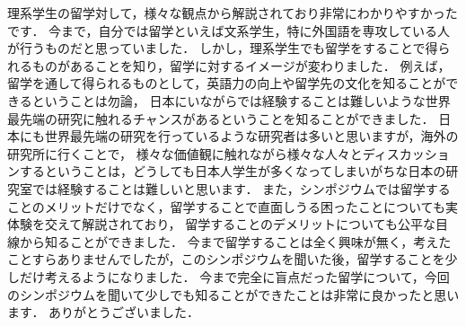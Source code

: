 理系学生の留学対して，様々な観点から解説されており非常にわかりやすかったです．
今まで，自分では留学といえば文系学生，特に外国語を専攻している人が行うものだと思っていました．
しかし，理系学生でも留学をすることで得られるものがあることを知り，留学に対するイメージが変わりました．
例えば，留学を通して得られるものとして，英語力の向上や留学先の文化を知ることができるということは勿論，
日本にいながらでは経験することは難しいような世界最先端の研究に触れるチャンスがあるということを知ることができました．
日本にも世界最先端の研究を行っているような研究者は多いと思いますが，海外の研究所に行くことで，
様々な価値観に触れながら様々な人々とディスカッションするということは，どうしても日本人学生が多くなってしまいがちな日本の研究室では経験することは難しいと思います．
また，シンポジウムでは留学することのメリットだけでなく，留学することで直面しうる困ったことについても実体験を交えて解説されており，
留学することのデメリットについても公平な目線から知ることができました．
今まで留学することは全く興味が無く，考えたことすらありませんでしたが，このシンポジウムを聞いた後，留学することを少しだけ考えるようになりました．
今まで完全に盲点だった留学について，今回のシンポジウムを聞いて少しでも知ることができたことは非常に良かったと思います．
ありがとうございました．